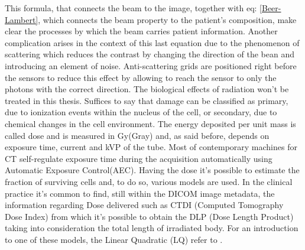 This formula, that connects the beam to the image, together with eq: \ref{Beer-Lambert}, which connects the beam property to the patient's composition, make clear the processes by which the beam carries patient information. Another complication arises in the context of this last equation due to the phenomenon of scattering which reduces the contrast by changing the direction of the bean and introducing an element of noise. Anti-scattering grids are positioned right before the sensors to reduce this effect by allowing to reach the sensor to only the photons with the correct direction.
\newline The biological effects of radiation won't be treated in this thesis. Suffices to say that damage can be classified as primary, due to ionization events within the nucleus of the cell, or secondary, due to chemical changes in the cell environment. The energy deposited per unit mass is called dose and is measured in Gy(Gray) and, as said before, depends on exposure time, current and kVP of the tube. Most of contemporary machines for CT self-regulate exposure time during the acquisition automatically using Automatic Exposure Control(AEC). Having the dose it's possible to estimate the fraction of surviving cells and, to do so, various models are used. In the clinical practice it's common to find, still within the DICOM image metadata, the information regarding Dose delivered such as CTDI (Computed Tomography Dose Index) from which it's possible to obtain the DLP (Dose Length Product) taking into consideration the total length of irradiated body. For an introduction to one of these models, the Linear Quadratic (LQ) refer to \cite{LQ_model}.\newline 

